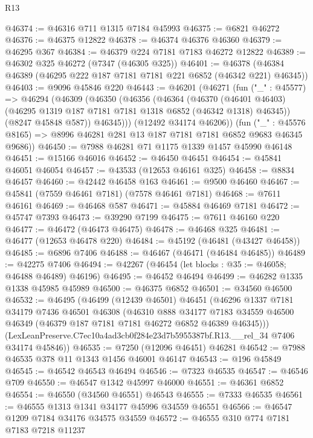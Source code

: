 \begin{lexlean}{R13}
\begin{coremodule}
@46374 := @46316 @711 @1315 @7184 @45993
@46375 := @6821 @46272
@46376 := @46375 @12822
@46378 := @46374 @46376 @46360
@46379 := @46295 @367
@46384 := @46379 @224 @7181 @7183 @46272 @12822
@46389 := @46302 @325 @46272 (@7347 (@46305 @325))
@46401 := @46378 (@46384 @46389 (@46295 @222 @187 @7181 @7181 @221 @6852 (@46342 @221) @46345))
@46403 := @9096 @45846 @220
@46443 := @46201
    (@46271
      (fun ("_" : @45577) =>
      @46294
        (@46309
          (@46350
            (@46356
              (@46364
                (@46370
                  (@46401 @46403)
                  (@46295 @1319 @187 @7181 @7181 @1318 @6852 (@46342 @1318) @46345))
                (@8247 @45848 @587))
              @46345)))
        (@12492 @34174 @46206))
      (fun ("_" : @45576 @8165) => @8996 @46281 @281 @13 @187 @7181 @7181 @6852 @9683 @46345 @9686))
@46450 := @7988 @46281 @71 @1175 @1339 @1457 @45990 @46148
@46451 := @15166 @46016
@46452 := @46450 @46451
@46454 := @45841 @46051 @46054
@46457 := @43533 (@12653 @46161 @325)
@46458 := @8834 @46457
@46460 := @42442 @46458 @163
@46461 := @9500 @46460
@46467 := @45841 (@7559 @46461 @7181) (@7578 @46461 @7181)
@46468 := @7611 @46161
@46469 := @46468 @587
@46471 := @45884 @46469 @7181
@46472 := @45747 @7393
@46473 := @39290 @7199
@46475 := @7611 @46160 @220
@46477 := @46472 (@46473 @46475)
@46478 := @46468 @325
@46481 := @46477 (@12653 @46478 @220)
@46484 := @45192 (@46481 (@43427 @46458))
@46485 := @6896 @7406
@46488 := @46467 (@46471 (@46484 @46485))
@46489 := @42275 @7406
@46494 := @42267 (@46454 (let blocks : @35 := @46058; @46488 @46489) @46196)
@46495 := @46452 @46494
@46499 := @46282 @1335 @1338 @45985 @45989
@46500 := @46375 @6852
@46501 := @34560 @46500
@46532 := @46495
    (@46499
      (@12439 @46501)
      @46451
      (@46296
        @1337
        @7181
        @34179
        @7436
        @46501
        @46308
        (@46310
          @888
          @34177
          @7183
          @34559
          @46500
          @46349
          (@46379 @187 @7181 @7181 @46272 @6852 @46389 @46345)))
      (LexLeanPreserve.C7ec10a4ad3cb0f284e23d7b5955387bf.R13.__rel_34 @7406 @34174 @45846))
@46535 := @7250 (@12096 @46451) @46281
@46542 := @7988 @46535 @378 @11 @1343 @1456 @46001 @46147
@46543 := @196 @45849
@46545 := @46542 @46543 @46494
@46546 := @7323 @46535
@46547 := @46546 @709
@46550 := @46547 @1342 @45997 @46000
@46551 := @46361 @6852
@46554 := @46550 (@34560 @46551) @46543
@46555 := @7333 @46535
@46561 := @46555 @1313 @1341 @34177 @45996 @34559 @46551
@46566 := @46547 @1209 @7184 @34176 @34575 @34559
@46572 := @46555 @310 @774 @7181 @7183 @7218 @11237

\end{coremodule}
\end{lexlean}
